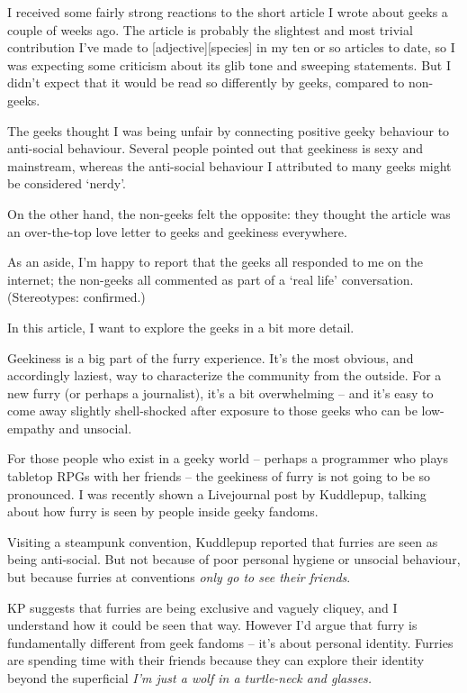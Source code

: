 
I received some fairly strong reactions to the short article I wrote about geeks a couple of weeks ago. The article is probably the slightest and most trivial contribution I've made to [adjective][species] in my ten or so articles to date, so I was expecting some criticism about its glib tone and sweeping statements. But I didn't expect that it would be read so differently by geeks, compared to non-geeks.

The geeks thought I was being unfair by connecting positive geeky behaviour to anti-social behaviour. Several people pointed out that geekiness is sexy and mainstream, whereas the anti-social behaviour I attributed to many geeks might be considered `nerdy'.

On the other hand, the non-geeks felt the opposite: they thought the article was an over-the-top love letter to geeks and geekiness everywhere.

As an aside, I'm happy to report that the geeks all responded to me on the internet; the non-geeks all commented as part of a `real life' conversation. (Stereotypes: confirmed.)

In this article, I want to explore the geeks in a bit more detail.

Geekiness is a big part of the furry experience. It's the most obvious, and accordingly laziest, way to characterize the community from the outside. For a new furry (or perhaps a journalist), it's a bit overwhelming -- and it's easy to come away slightly shell-shocked after exposure to those geeks who can be low-empathy and unsocial.

For those people who exist in a geeky world -- perhaps a programmer who plays tabletop RPGs with her friends -- the geekiness of furry is not going to be so pronounced. I was recently shown a Livejournal post by Kuddlepup, talking about how furry is seen by people inside geeky fandoms.

Visiting a steampunk convention, Kuddlepup reported that furries are seen as being anti-social. But not because of poor personal hygiene or unsocial behaviour, but because furries at conventions \textit{only go to see their friends}.

KP suggests that furries are being exclusive and vaguely cliquey, and I understand how it could be seen that way. However I'd argue that furry is fundamentally different from geek fandoms -- it's about personal identity. Furries are spending time with their friends because they can explore their identity beyond the superficial \textit{I'm just a wolf in a turtle-neck and glasses.}


